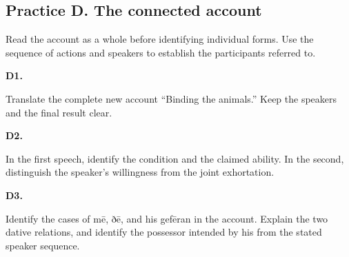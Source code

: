 \par\begin{minipage}{\linewidth}\raggedright
{}
\end{minipage}\par

\subsection*{Practice D. The connected account}

Read the account as a whole before identifying individual forms. Use the sequence of actions and speakers to establish the participants referred to.

\par\begin{minipage}{\linewidth}\raggedright
\textbf{D1.}

Translate the complete new account “Binding the animals.” Keep the speakers and the final result clear.

\end{minipage}\par\addvspace{4pt}

\par\begin{minipage}{\linewidth}\raggedright
\textbf{D2.}

In the first speech, identify the condition and the claimed ability. In the second, distinguish the speaker’s willingness from the joint exhortation.

\end{minipage}\par\addvspace{4pt}

\par\begin{minipage}{\linewidth}\raggedright
\textbf{D3.}

Identify the cases of mē, ðē, and his gefēran in the account. Explain the two dative relations, and identify the possessor intended by his from the stated speaker sequence.

\end{minipage}\par\addvspace{4pt}

